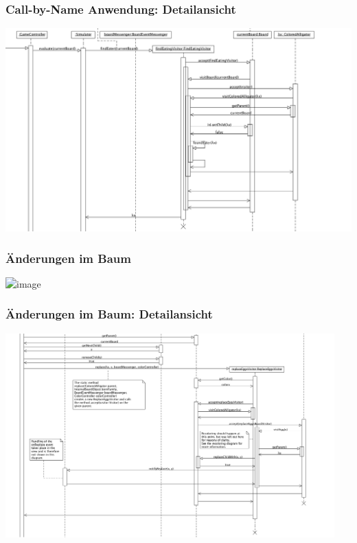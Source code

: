 \documentclass[t]{beamer}
\begin{document}
\begin{frame}
	\frametitle{Call-by-Name Anwendung: Detailansicht}
	\includegraphics[width=\textwidth]{FindLocation.png}
\end{frame}



\begin{frame}
	\frametitle{Änderungen im Baum}
	\begin{center}
		\includegraphics<1>[width=0.5\textwidth]{Beta-Reduktion-withBlue.png}
	\end{center}
\end{frame}

\begin{frame}
	\frametitle{Änderungen im Baum: Detailansicht}
	\includegraphics[width=0.95\textwidth]{ReplaceEggs.png}
\end{frame}
\end{document}
